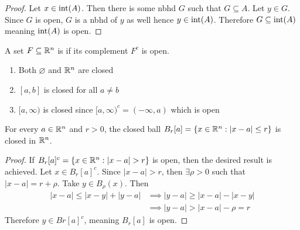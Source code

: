 \documentclass[../main.tex]{subfiles}
\begin{document}
\begin{proof}
    Let $x \in \operatorname{int}(A)$. Then there is some nbhd $G$ such that $G \subseteq A$. Let $y \in G$. Since $G$ is open, $G$ is a nbhd of $y$ as well hence $y \in \operatorname{int}(A)$. Therefore $G \subseteq \operatorname{int}(A)$ meaning $\operatorname{int}(A)$ is open.
\end{proof}

\begin{definition}
    A set $F \subseteq \mathbb{R}^n$ is  if its complement $F^c$ is open.
\end{definition}

\begin{example}
    \hfill
    \begin{enumerate}[label=\roman*)]
        \item Both $\varnothing$ and $\mathbb{R}^n$ are closed
        \item $[a,b]$ is closed for all $a \neq b$
        \item $[a,\infty)$ is closed since $[a, \infty)^c = (-\infty, a)$ which is open
    \end{enumerate}
\end{example}

\begin{theorem}
    For every $a \in \mathbb{R}^n$ and $r > 0$, the closed ball $B_r[a] = \qty{x \in \mathbb{R}^n : |x - a| \leq r}$ is closed in $\mathbb{R}^n$.
\end{theorem}

\begin{proof}
    If $B_r[a]^c = \qty{x \in \mathbb{R}^n : |x-a| > r}$ is open, then the desired result is achieved. Let $x \in B_r[a]^c$. Since $|x-a| > r$, then $\exists \rho > 0$ such that $|x-a| = r + \rho$. Take $y \in B_{\rho}(x)$. Then
    \begin{align*}
        |x-a| \leq |x-y| + |y-a| &\implies |y - a| \geq |x-a| - |x-y| \\
                                 &\implies |y-a| > |x-a| - \rho = r
    \end{align*}
    Therefore $y \in Br[a]^c$, meaning $B_r[a]$ is open.
\end{proof}
\end{document}
